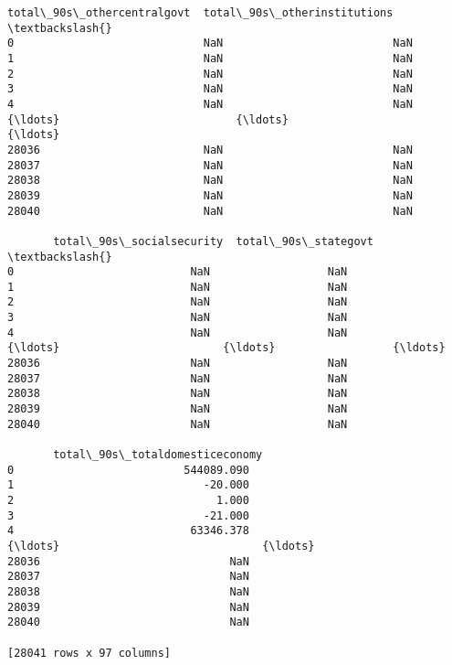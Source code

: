 \documentclass[11pt]{article}
\begin{document}
\begin{Verbatim}[commandchars=\\\{\}]
       total\_90s\_othercentralgovt  total\_90s\_otherinstitutions  \textbackslash{}
0                             NaN                          NaN
1                             NaN                          NaN
2                             NaN                          NaN
3                             NaN                          NaN
4                             NaN                          NaN
{\ldots}                           {\ldots}                          {\ldots}
28036                         NaN                          NaN
28037                         NaN                          NaN
28038                         NaN                          NaN
28039                         NaN                          NaN
28040                         NaN                          NaN

       total\_90s\_socialsecurity  total\_90s\_stategovt  \textbackslash{}
0                           NaN                  NaN
1                           NaN                  NaN
2                           NaN                  NaN
3                           NaN                  NaN
4                           NaN                  NaN
{\ldots}                         {\ldots}                  {\ldots}
28036                       NaN                  NaN
28037                       NaN                  NaN
28038                       NaN                  NaN
28039                       NaN                  NaN
28040                       NaN                  NaN

       total\_90s\_totaldomesticeconomy
0                          544089.090
1                             -20.000
2                               1.000
3                             -21.000
4                           63346.378
{\ldots}                               {\ldots}
28036                             NaN
28037                             NaN
28038                             NaN
28039                             NaN
28040                             NaN

[28041 rows x 97 columns]
    \end{Verbatim}
\end{document}
